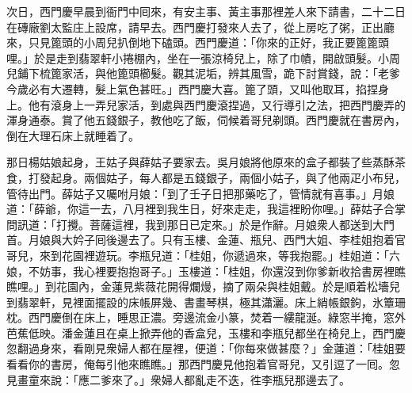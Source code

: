 次日，西門慶早晨到衙門中囘來，有安主事、黃主事那裡差人來下請書，二十二日在磚廠劉太監庄上設席，請早去。西門慶打發來人去了，從上房吃了粥，正出廳來，只見篦頭的小周兒扒倒地下磕頭。西門慶道：「你來的正好，我正要篦篦頭哩。」於是走到翡翠軒小捲棚內，坐在一張涼椅兒上，除了巾幘，開啟頭髮。小周兒鋪下梳篦家活，與他篦頭櫛髮。觀其泥垢，辨其風雪，跪下討賞錢，說：「老爹今歲必有大遷轉，髮上氣色甚旺。」西門慶大喜。篦了頭，又叫他取耳，掐捏身上。他有滾身上一弄兒家活，到處與西門慶滾捏過，又行導引之法，把西門慶弄的渾身通泰。賞了他五錢銀子，教他吃了飯，伺候着哥兒剃頭。西門慶就在書房內，倒在大理石床上就睡着了。

那日楊姑娘起身，王姑子與薛姑子要家去。吳月娘將他原來的盒子都裝了些蒸酥茶食，打發起身。兩個姑子，每人都是五錢銀子，兩個小姑子，與了他兩疋小布兒，管待出門。薛姑子又囑咐月娘：「到了壬子日把那藥吃了，管情就有喜事。」月娘道：「薛爺，你這一去，八月裡到我生日，好來走走，我這裡盼你哩。」薛姑子合掌問訊道：「打攪。菩薩這裡，我到那日已定來。」於是作辭。月娘衆人都送到大門首。月娘與大妗子囘後邊去了。只有玉樓、金蓮、瓶兒、西門大姐、李桂姐抱着官哥兒，來到花園裡遊玩。李瓶兒道：「桂姐，你遞過來，等我抱罷。」桂姐道：「六娘，不妨事，我心裡要抱抱哥子。」玉樓道：「桂姐，你還沒到你爹新收拾書房裡瞧瞧哩。」到花園內，金蓮見紫薇花開得爛熳，摘了兩朵與桂姐戴。{}於是順着松墻兒到翡翠軒，見裡面擺設的床帳屏幾、書畫琴棋，極其瀟灑。床上綃帳銀鉤，氷簟珊枕。西門慶倒在床上，睡思正濃。旁邊流金小篆，焚着一縷龍涎。綠窓半掩，窓外芭蕉低映。潘金蓮且在桌上掀弄他的香盒兒，玉樓和李瓶兒都坐在椅兒上，西門慶忽翻過身來，看剛見衆婦人都在屋裡，便道：「你每來做甚麼？」金蓮道：「桂姐要看看你的書房，俺每引他來瞧瞧。」那西門慶見他抱着官哥兒，又引逗了一囘。忽見畫童來說：「應二爹來了。」衆婦人都亂走不迭，徃李瓶兒那邊去了。

